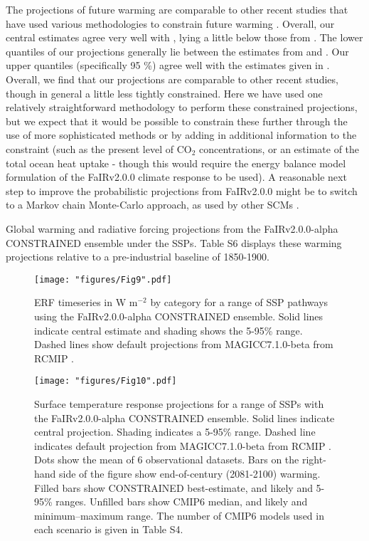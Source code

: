 \documentclass[gmd, manuscript]{copernicus}
\begin{document}
The projections of future warming are comparable to other recent studies that have used various methodologies to constrain future warming \citep{Brunner2020,Tokarska2020a,Ribes2021}. Overall, our central estimates agree very well with \citet{Tokarska2020a,Ribes2021}, lying a little below those from \citet{Ribes2021}. The lower quantiles of our projections generally lie between the estimates from \citet{Tokarska2020a} and \citet{Ribes2021}. Our upper quantiles (specifically 95 \%) agree well with the estimates given in \citet{Ribes2021}. Overall, we find that our projections are comparable to other recent studies, though in general a little less tightly constrained. Here we have used one relatively straightforward methodology to perform these constrained projections, but we expect that it would be possible to constrain these further through the use of more sophisticated methods or by adding in additional information to the constraint (such as the present level of CO$_2$ concentrations, or an estimate of the total ocean heat uptake - though this would require the energy balance model formulation of the FaIRv2.0.0 climate response to be used). A reasonable next step to improve the probabilistic projections from FaIRv2.0.0 might be to switch to a Markov chain Monte-Carlo approach, as used by other SCMs \citep{Meinshausen2011b,Meinshausen2019}.
\clearpage
\begin{table}[t]
    \caption{Global warming and radiative forcing projections from the FaIRv2.0.0-alpha CONSTRAINED ensemble under the SSPs. Table S6 displays these warming projections relative to a pre-industrial baseline of 1850-1900.}
    \label{table:SSP_projections}
    
\end{table}
%
\clearpage
\begin{figure}[t]
    \texttt{[image: "figures/Fig9".pdf]}
    \caption{ERF timeseries in W m$^{-2}$ by category for a range of SSP pathways using the FaIRv2.0.0-alpha CONSTRAINED ensemble. Solid lines indicate central estimate and shading shows the 5-95\% range. Dashed lines show default projections from MAGICC7.1.0-beta from RCMIP \citep{Nicholls2019}.}
    \label{fig:NROY_SSP_ERF}
\end{figure}
\clearpage
%
\begin{figure}[t]
    \texttt{[image: "figures/Fig10".pdf]}
    \caption{Surface temperature response projections for a range of SSPs with the FaIRv2.0.0-alpha CONSTRAINED ensemble. Solid lines indicate central projection. Shading indicates a 5-95\% range. Dashed line indicates default projection from MAGICC7.1.0-beta from RCMIP \citep{Nicholls2019}. Dots show the mean of 6 observational datasets. Bars on the right-hand side of the figure show end-of-century (2081-2100) warming. Filled bars show CONSTRAINED best-estimate, and likely and 5-95\% ranges. Unfilled bars show CMIP6 median, and likely and minimum--maximum range. The number of CMIP6 models used in each scenario is given in Table S4.}
    \label{fig:NROY_SSP}
\end{figure}
\clearpage
%
\end{document}
